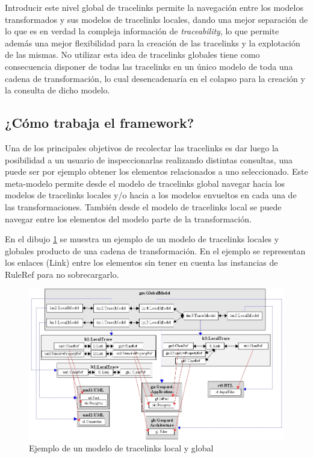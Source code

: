 \documentclass[a4paper,12pt,oneside,spanish]{book}
\begin{document}
Introducir este nivel global de tracelinks permite la navegación entre los modelos transformados y sus modelos de tracelinks locales, dando una mejor separación de lo que es en verdad la compleja información de \textit{traceability}, lo que permite además una mejor flexibilidad para la creación de las tracelinks y la explotación de las mismas. No utilizar esta idea de tracelinks globales tiene como consecuencia disponer de todas las tracelinks en un único modelo de toda una cadena de transformación, lo cual desencadenaría en el colapso para la creación y la consulta de dicho modelo.

\subsection{¿Cómo trabaja el framework?}

Una de los principales objetivos de recolectar las tracelinks es dar luego la posibilidad a un usuario de inspeccionarlas realizando distintas consultas, una puede ser por ejemplo obtener los elementos relacionados a uno seleccionado. Este meta-modelo permite desde el modelo de tracelinks global navegar hacia los modelos de tracelinks locales y/o hacia a los modelos envueltos en cada una de las transformaciones. También desde el modelo de tracelinks local se puede navegar entre los elementos del modelo parte de la transformación.

En el dibujo \ref{fig:EjemploLocalGlobalMetamodel} se muestra un ejemplo de un modelo de tracelinks locales y globales producto de una cadena de transformación. En el ejemplo se representan los enlaces (Link) entre los elementos sin tener en cuenta las instancias de RuleRef para no sobrecargarlo.

\begin{figure}[hbtp]
\centering
\includegraphics[scale=.45]{./img/EjemploLocalGlobalMetamodel}
\caption{Ejemplo de un modelo de tracelinks local y global}
\label{fig:EjemploLocalGlobalMetamodel}
\end{figure}
\end{document}
